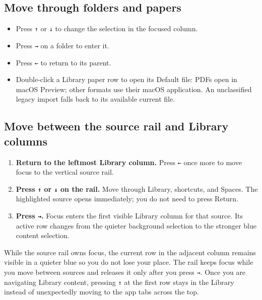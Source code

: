 \documentclass[10pt,letterpaper,oneside]{scrreprt}
\providecommand{\tightlist}{\setlength{\itemsep}{1pt}\setlength{\parskip}{0pt}}
\begin{document}
\subsection{Move through folders and papers}\label{move-through-folders-and-papers}

\begin{itemize}
\tightlist
\item
  Press \texttt{{\symbolfont ↑}} or \texttt{{\symbolfont ↓}} to change the selection in the focused column.
\item
  Press \texttt{{\symbolfont →}} on a folder to enter it.
\item
  Press \texttt{{\symbolfont ←}} to return to its parent.
\item
  Double-click a Library paper row to open its Default file: PDFs open in macOS Preview; other formats use their macOS application. An unclassified legacy import falls back to its available current file.
\end{itemize}

\subsection{Move between the source rail and Library columns}\label{move-between-the-source-rail-and-library-columns}

\begin{enumerate}
\tightlist
\item
  \textbf{Return to the leftmost Library column.} Press \texttt{{\symbolfont ←}} once more to move focus to the vertical source rail.
\item
  \textbf{Press \texttt{{\symbolfont ↑}} or \texttt{{\symbolfont ↓}} on the rail.} Move through Library, shortcuts, and Spaces. The highlighted source opens immediately; you do not need to press Return.
\item
  \textbf{Press \texttt{{\symbolfont →}}.} Focus enters the first visible Library column for that source. Its active row changes from the quieter background selection to the stronger blue content selection.
\end{enumerate}

While the source rail owns focus, the current row in the adjacent column remains visible in a quieter blue so you do not lose your place. The rail keeps focus while you move between sources and releases it only after you press \texttt{{\symbolfont →}}. Once you are navigating Library content, pressing \texttt{{\symbolfont ↑}} at the first row stays in the Library instead of unexpectedly moving to the app tabs across the top.
\end{document}
